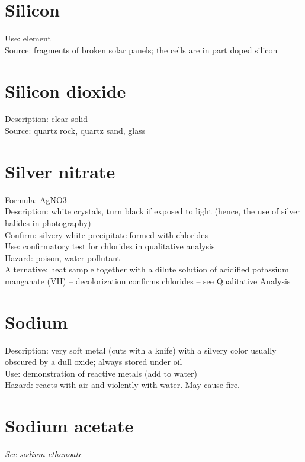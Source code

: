 \section{Silicon}
Use: element\\
Source: fragments of broken solar panels; 
the cells are in part doped silicon

\section{Silicon dioxide}
Description: clear solid\\
Source: quartz rock, 
quartz sand, 
glass

\section{Silver nitrate}
Formula: AgNO3\\
Description: white crystals, 
turn black if exposed to light (hence, 
the use of silver halides in photography)\\
Confirm: silvery-white precipitate formed with chlorides\\
Use: confirmatory test for chlorides in qualitative analysis\\
Hazard: poison, 
water pollutant\\
Alternative: heat sample together 
with a dilute solution of acidified potassium manganate (VII) – 
decolorization confirms chlorides – see Qualitative Analysis

\section{Sodium}
Description: very soft metal (cuts with a knife) 
with a silvery color usually obscured by a dull oxide; 
always stored under oil\\
Use: demonstration of reactive metals (add to water)\\
Hazard: reacts with air and violently with water. 
May cause fire.

\section{Sodium acetate}
\textit{See sodium ethanoate}

